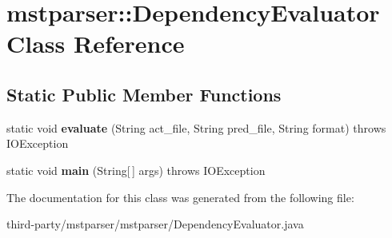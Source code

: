 \hypertarget{classmstparser_1_1DependencyEvaluator}{
\section{mstparser::DependencyEvaluator Class Reference}
\label{classmstparser_1_1DependencyEvaluator}
}
\subsection*{Static Public Member Functions}
\begin{DoxyCompactItemize}
\item 
\hypertarget{classmstparser_1_1DependencyEvaluator_a2f76646d58ca8c8a4828943a1a76a13a}{
static void {\bfseries evaluate} (String act\_\-file, String pred\_\-file, String format)  throws IOException }
\label{classmstparser_1_1DependencyEvaluator_a2f76646d58ca8c8a4828943a1a76a13a}

\item 
\hypertarget{classmstparser_1_1DependencyEvaluator_af3fbd51a912b1069b1d099b31968a30f}{
static void {\bfseries main} (String\mbox{[}$\,$\mbox{]} args)  throws IOException }
\label{classmstparser_1_1DependencyEvaluator_af3fbd51a912b1069b1d099b31968a30f}

\end{DoxyCompactItemize}


The documentation for this class was generated from the following file:\begin{DoxyCompactItemize}
\item 
third-\/party/mstparser/mstparser/DependencyEvaluator.java\end{DoxyCompactItemize}
